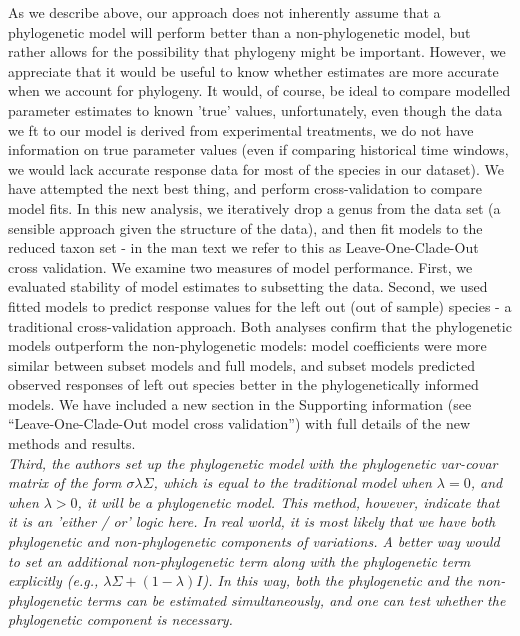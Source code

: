 \documentclass[11pt]{article}
\begin{document}
As we describe above, our approach does not inherently assume that a phylogenetic model will perform better than a non-phylogenetic model, but rather allows for the possibility that phylogeny might be important. However, we appreciate that it would be useful to know whether estimates are more accurate when we account for phylogeny. It would, of course, be ideal to compare modelled parameter estimates to known 'true' values, unfortunately, even though the data we ft to our model is derived from experimental treatments, we do not have information on true parameter values (even if comparing historical time windows, we would lack accurate response data for most of the species in our dataset). We have attempted the next best thing, and perform cross-validation to compare model fits. In this new analysis, we iteratively drop a genus from the data set (a sensible approach given the structure of the data), and then fit models to the reduced taxon set - in the man text we refer to this as Leave-One-Clade-Out cross validation. We examine two measures of model performance. First, we evaluated stability of model estimates to subsetting the data. Second, we used fitted models to predict response values for the left out (out of sample) species - a traditional cross-validation approach. Both analyses confirm that the phylogenetic models outperform the non-phylogenetic models: model coefficients were more similar between subset models and full models, and subset models predicted observed responses of left out species better in the phylogenetically informed models. We have included a new section in the Supporting information (see ``Leave-One-Clade-Out model cross validation'') with full details of the new methods and results.\\

\emph{Third, the authors set up the phylogenetic model with the phylogenetic var-covar matrix of the form $\sigma\lambda\Sigma$, which is equal to the traditional model when $\lambda=0$, and when $\lambda>0$, it will be a phylogenetic model. This method, however, indicate that it is an 'either / or' logic here. In real world, it is most likely that we have both phylogenetic and non-phylogenetic components of variations. A better way would to set an additional non-phylogenetic term along with the phylogenetic term explicitly (e.g., $\lambda \Sigma + (1-\lambda)I$). In this way, both the phylogenetic and the non-phylogenetic terms can be estimated simultaneously, and one can test whether the phylogenetic component is necessary.}\\
\end{document}
